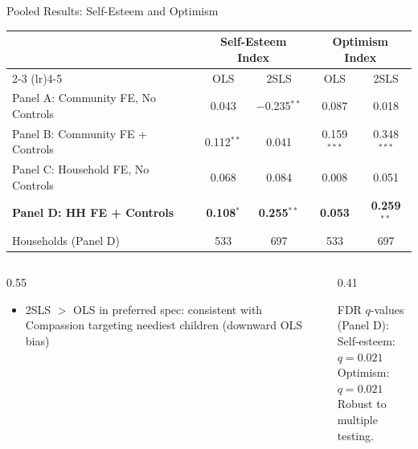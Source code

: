 \documentclass[aspectratio=169, 10pt]{beamer}
\begin{document}
\begin{frame}{Pooled Results: Self-Esteem and Optimism}
  \begin{center}
  \small
  \begin{tabular}{lcccc}
    \toprule
    & \multicolumn{2}{c}{\textbf{Self-Esteem Index}} & \multicolumn{2}{c}{\textbf{Optimism Index}} \\
    \cmidrule(lr){2-3} \cmidrule(lr){4-5}
    & OLS & 2SLS & OLS & 2SLS \\
    \midrule
    Panel A: Community FE, No Controls    & 0.043 & $-$0.235$^{**}$ & 0.087 & 0.018 \\
    Panel B: Community FE + Controls      & 0.112$^{**}$ & 0.041 & 0.159$^{***}$ & 0.348$^{***}$ \\
    Panel C: Household FE, No Controls   & 0.068 & 0.084 & 0.008 & 0.051 \\
    \textbf{Panel D: HH FE + Controls}   & \textbf{0.108}$^{*}$ & \textbf{0.255}$^{**}$ & \textbf{0.053} & \textbf{0.259}$^{**}$ \\
    \midrule
    Households (Panel D) & 533 & 697 & 533 & 697 \\
    \bottomrule
  \end{tabular}
  \end{center}
  \vspace{0.3em}
  \begin{columns}
    \begin{column}{0.55\textwidth}
      \begin{itemize}
        \item 2SLS $>$ OLS in preferred spec: consistent with Compassion targeting neediest children (downward OLS bias)
      \end{itemize}
    \end{column}
    \begin{column}{0.41\textwidth}
      \begin{methodbox}
        \small FDR $q$-values (Panel D):\\
        Self-esteem: $q = 0.021$\\
        Optimism: $q = 0.021$\\[0.3em]
        Robust to multiple testing.
      \end{methodbox}
    \end{column}
  \end{columns}
\end{frame}
\end{document}
